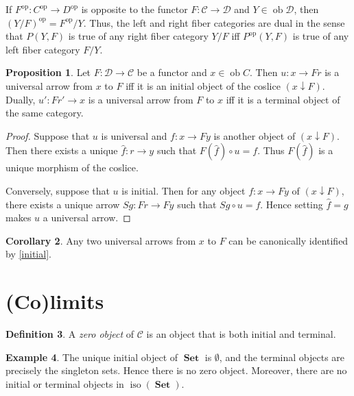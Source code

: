 \documentclass[10pt,letterpaper,cm]{nupset}
\theoremstyle{definition}
\newtheorem{definition}{Definition}[section]
\newtheorem{exmp}[definition]{Example}
\theoremstyle{theorem}
\newtheorem{corollary}[definition]{Corollary}
\newtheorem{prop}[definition]{Proposition}
\theoremstyle{remark}
\newcommand{\1}{\mathbf{1}}
\renewcommand{\c}{\mathscr{C}}
\renewcommand{\d}{\mathscr{D}}
\newcommand{\0}{\vec 0}
\DeclareMathOperator{\op}{op}
\DeclareMathOperator{\ob}{ob}
\DeclareMathOperator{\iso}{iso}
\DeclareMathOperator{\set}{\mathbf{Set}}
\begin{document}
If $F^{\op}:C^{\op} \to D^{\op}$ is opposite to the functor $F: \c \to \d$ and $Y \in \ob \d$, then $\left(Y/F\right)^{\op} = {F^{\op}}/{Y}$. Thus, the left and right fiber categories are dual in the sense that $P(Y, F)$ is true of any right fiber category ${Y}/{F}$ iff $P^{\op}(Y, F)$ is true of any left fiber category ${F}/{Y}$. 

\smallskip

\begin{prop}
Let $F : \d \to \c$ be a functor and $x \in \ob C$. Then $u : x \to Fr$ is a universal arrow from $x$ to $F$ iff it is an initial object of the coslice $\left(x \downarrow F\right)$. Dually, $u' : Fr' \to x$ is a universal arrow from $F$ to $x$  iff it is a terminal object of the same category.
\end{prop}
\begin{proof}
Suppose that $u$ is universal and $f: x \to Fy$ is another object of $\left(x \downarrow F\right)$. Then there exists a unique $\hat{f}: r \to y$ such that $F\left(\hat{f}\right) \circ u = f$. Thus $F\left(\hat{f}\right)$ is a unique morphism of the coslice.

\smallskip

Conversely, suppose that $u$ is initial. Then for any object $f: x \to Fy$ of $\left(x \downarrow F\right)$, there exists a unique arrow $Sg : Fr \to Fy$ such that $Sg \circ u = f$. Hence setting $\hat{f} = g$ makes $u$ a universal arrow.
\end{proof}

\begin{corollary}
Any two universal arrows from $x$ to $F$ can be canonically identified by \cref{initial}.
\end{corollary}

\section{(Co)limits}

\begin{definition}
A \textit{zero object} of $\c$ is an object that is both initial and terminal.
\end{definition}

\begin{exmp}
The unique initial object of $\set$ is $\emptyset$, and the terminal objects are precisely the singleton sets. Hence there is no zero object. Moreover, there are no initial or terminal objects in $\iso(\set)$.
\end{exmp}
\end{document}
